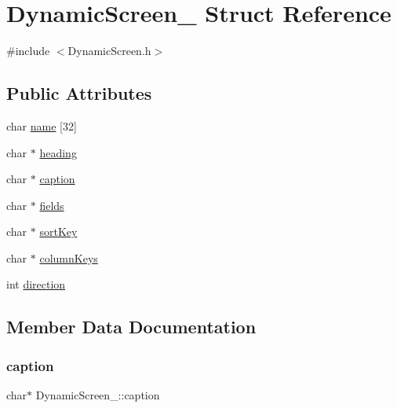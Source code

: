 \hypertarget{structDynamicScreen__}{}\section{Dynamic\+Screen\+\_\+ Struct Reference}
\label{structDynamicScreen__}


{\ttfamily \#include $<$Dynamic\+Screen.\+h$>$}

\subsection*{Public Attributes}
\begin{DoxyCompactItemize}
\item 
char \hyperlink{structDynamicScreen___ae60a4cb1482ce823bbf6ef84f9c04547}{name} \mbox{[}32\mbox{]}
\item 
char $\ast$ \hyperlink{structDynamicScreen___ae221283f1b0e1c628de803f117d645b0}{heading}
\item 
char $\ast$ \hyperlink{structDynamicScreen___a4f5b26b4f0cdc8f13c9bd27f69708bd6}{caption}
\item 
char $\ast$ \hyperlink{structDynamicScreen___a8a2dd6b1f397dadbca7a1fe66333a3bc}{fields}
\item 
char $\ast$ \hyperlink{structDynamicScreen___a520443cf839a6a4f66acef73804474bf}{sort\+Key}
\item 
char $\ast$ \hyperlink{structDynamicScreen___a1143e4d783c420f258caac6b8beecad1}{column\+Keys}
\item 
int \hyperlink{structDynamicScreen___a7414bc56c3d7ee333f52d3c954a76f68}{direction}
\end{DoxyCompactItemize}


\subsection{Member Data Documentation}
\mbox{\label{structDynamicScreen___a4f5b26b4f0cdc8f13c9bd27f69708bd6}} 
\subsubsection{\texorpdfstring{caption}{caption}}
{\footnotesize\ttfamily char$\ast$ Dynamic\+Screen\+\_\+\+::caption}

\mbox{\label{structDynamicScreen___a1143e4d783c420f258caac6b8beecad1}} 
